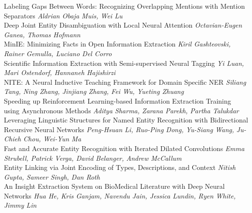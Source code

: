 \documentclass{book}
\begin{document}
    \noindent	Labeling Gaps Between Words: Recognizing Overlapping Mentions with Mention Separators \newline 
    {\itshape Aldrian Obaja Muis, Wei Lu} \\
    
    \noindent	Deep Joint Entity Disambiguation with Local Neural Attention \newline 
    {\itshape Octavian-Eugen Ganea, Thomas Hofmann} \\
    
    \noindent	MinIE: Minimizing Facts in Open Information Extraction \newline 
    {\itshape Kiril Gashteovski, Rainer Gemulla, Luciano Del Corro} \\
    
    \noindent	Scientific Information Extraction with Semi-supervised Neural Tagging \newline 
    {\itshape Yi Luan, Mari Ostendorf, Hannaneh Hajishirzi} \\
    
    \noindent	NITE: A Neural Inductive Teaching Framework for Domain Specific NER \newline 
    {\itshape Siliang Tang, Ning Zhang, Jinjiang Zhang, Fei Wu, Yueting Zhuang} \\
    
    \noindent	Speeding up Reinforcement Learning-based Information Extraction Training using Asynchronous Methods \newline 
    {\itshape Aditya Sharma, Zarana Parekh, Partha Talukdar} \\
    
    \noindent	Leveraging Linguistic Structures for Named Entity Recognition with Bidirectional Recursive Neural Networks \newline 
    {\itshape Peng-Hsuan Li, Ruo-Ping Dong, Yu-Siang Wang, Ju-Chieh Chou, Wei-Yun Ma} \\
    
    \noindent	Fast and Accurate Entity Recognition with Iterated Dilated Convolutions \newline 
    {\itshape Emma Strubell, Patrick Verga, David Belanger, Andrew McCallum} \\
    
    \noindent	Entity Linking via Joint Encoding of Types, Descriptions, and Context \newline 
    {\itshape Nitish Gupta, Sameer Singh, Dan Roth} \\
    
    \noindent	An Insight Extraction System on BioMedical Literature with Deep Neural Networks \newline 
    {\itshape Hua He, Kris Ganjam, Navendu Jain, Jessica Lundin, Ryen White, Jimmy Lin} \\
    
\vspace*{\fill}
\end{document}
